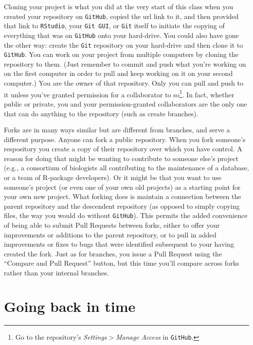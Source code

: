 \documentclass[12pt,letterpaper]{article}
\begin{document}
Cloning your project is what you did at the very start of this class when you created your repository on \texttt{GitHub}, copied the url link to it, and then provided that link to \texttt{RStudio}, your \texttt{Git GUI}, or \texttt{Git} itself to initiate the copying of everything that was on \texttt{GitHub} onto your hard-drive.
You could also have gone the other way:  create the \texttt{Git} repository on your hard-drive and then clone it to \texttt{GitHub}.
You can work on your project from multiple computers by cloning the repository to them.
(Just remember to commit and push what you're working on on the first computer in order to pull and keep working on it on your second computer.)
You are the owner of that repository.
Only you can pull and push to it unless you've granted permission for a collaborator to so\footnote{Go to the repository's \emph{Settings$>$Manage Access} in \texttt{GitHub}.}.
In fact, whether public or private, you and your permission-granted collaborators are the only one that can do anything to the repository (such as create branches).

Forks are in many ways similar but are different from branches, and serve a different purpose.
Anyone can fork a public repository.
When you fork someone's respository you create a copy of their repository over which you have control.
A reason for doing that might be wanting to contribute to someone else's project (e.g., a consortium of biologists all contributing to the maintenance of a database, or a team of R-package developers).
Or it might be that you want to use someone's project (or even one of your own old projects) as a starting point for your own new project.
What forking does is maintain a connection between the parent repository and the  descendent repository (as opposed to simply copying files, the way you would do without \texttt{GitHub}).
This permits the added convenience of being able to submit Pull Requests between forks, either to offer your improvements or additions to the parent repository, or to pull in added improvements or fixes to bugs that were identified subsequent to your having created the fork.
Just as for branches, you issue a Pull Request using the ``Compare and Pull Request'' button, but this time you'll compare across forks rather than your internal branches.



\section{Going back in time}
\end{document}
